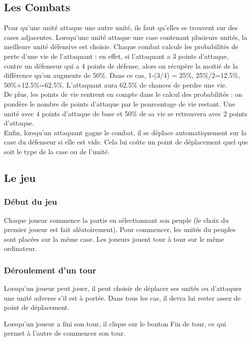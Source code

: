\subsection{Les Combats}
Pour qu'une unité attaque une autre unité, ils faut qu'elles se trouvent sur des cases adjacentes. Lorsqu'une unité attaque une case contenant plusieurs unités, la meilleure unité défensive est choisie. Chaque combat calcule les probabilités de perte d'une vie de l'attaquant : en effet, si l'attaquant a 3 points d'attaque, contre un défenseur qui a 4 points de défense, alors on récupère la moitié de la différence qu'on augmente de 50\%. Dans ce cas, 1-(3/4) = 25\%, 25\%/2=12.5\%, 50\%+12.5\%=62.5\%. L'attaquant aura 62.5\% de chances de perdre une vie.\newline \\
De plus, les points de vie rentrent en compte dans le calcul des probabilités : on pondère le nombre de points d'attaque par le pourcentage de vie restant. Une unité avec 4 points d'attaque de base et 50\% de sa vie se retrouvera avec 2 points d'attaque.\newline \\
Enfin, lorsqu'un attaquant gagne le combat, il se déplace automatiquement sur la case du défenseur si elle est vide. Cela lui coûte un point de déplacement quel que soit le type de la case ou de l'unité.

\subsection{Le jeu}
\subsubsection{Début du jeu}
Chaque joueur commence la partie en sélectionnant son peuple (le choix du premier joueur est fait aléatoirement). Pour commencer, les unités du peuples sont placées sur la même case. Les joueurs jouent tour à tour sur le même ordinateur.
\subsubsection{Déroulement d'un tour}
Lorsqu'un joueur peut jouer, il peut choisir de déplacer ses unités ou d'attaquer une unité adverse s'il est à portée. Dans tous les cas, il devra lui rester assez de point de déplacement.

Lorsqu'un joueur a fini son tour, il clique sur le bouton Fin de tour, ce qui permet à l'autre de commencer son tour.
